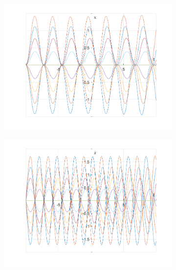 \documentclass{article}
\begin{document}
	\begin{figure}[h!]
		\centering
		\begin{subfigure}[b]{0.48\linewidth}
			\includegraphics[width=\linewidth]{./SmallOscillations/S10/F3.png}
		\end{subfigure}
		\begin{subfigure}[b]{0.48\linewidth}
			\includegraphics[width=\linewidth]{./SmallOscillations/S10/F4.png}
		\end{subfigure}
	\end{figure}
	
\end{document}
